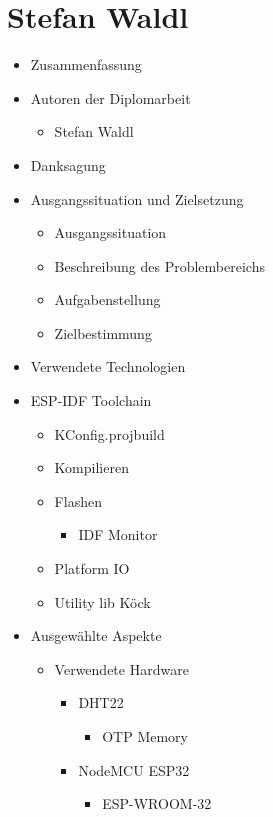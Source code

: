 \section*{Stefan Waldl}

\begin{itemize}
	\item Zusammenfassung
	\item Autoren der Diplomarbeit
	\begin{itemize}
		\item Stefan Waldl
	\end{itemize}
	\item Danksagung
	\item Ausgangssituation und Zielsetzung
	\begin{itemize}
		\item Ausgangssituation
		\item Beschreibung des Problembereichs
		\item Aufgabenstellung
		\item Zielbestimmung
	\end{itemize}
	\item Verwendete Technologien
	\item ESP-IDF Toolchain
	\begin{itemize}
		\item KConfig.projbuild
		\item Kompilieren
		\item Flashen
		\begin{itemize}
			\item IDF Monitor
		\end{itemize}
		\item Platform IO
		\item Utility lib Köck
	\end{itemize}
	\item Ausgewählte Aspekte
	\begin{itemize}
		\item Verwendete Hardware
		\begin{itemize}
			\item DHT22
			\begin{itemize}
				\item OTP Memory
			\end{itemize}
			\item NodeMCU ESP32
			\begin{itemize}
				\item ESP-WROOM-32
			\end{itemize}
		\end{itemize}

\end{itemize}
\end{itemize}
